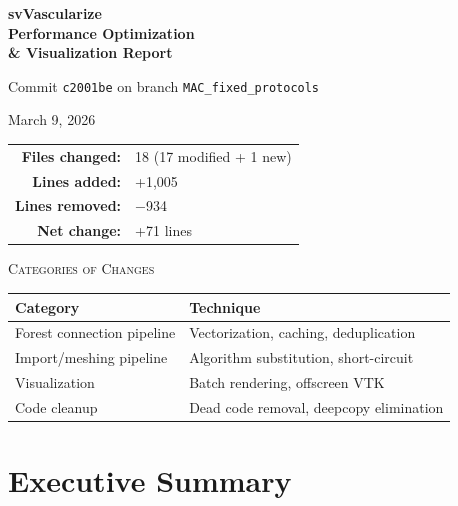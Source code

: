 \documentclass[11pt,a4paper]{article}
\begin{document}
\begin{titlepage}
\centering
\vspace*{3cm}
{\Huge\bfseries svVascularize\\[0.3em] Performance Optimization\\[0.3em] \& Visualization Report\par}
\vspace{1.5cm}
{\Large Commit \texttt{c2001be} on branch \texttt{MAC\_fixed\_protocols}\par}
\vspace{1cm}
{\large March 9, 2026\par}
\vspace{2cm}

\begin{tabular}{rl}
\textbf{Files changed:} & 18 (17 modified + 1 new) \\
\textbf{Lines added:} & +1,005 \\
\textbf{Lines removed:} & $-$934 \\
\textbf{Net change:} & +71 lines \\
\end{tabular}

\vspace{2cm}

{\large\textsc{Categories of Changes}}\\[0.5em]
\begin{tabular}{ll}
\toprule
Category & Technique \\
\midrule
Forest connection pipeline & Vectorization, caching, deduplication \\
Import/meshing pipeline & Algorithm substitution, short-circuit \\
Visualization & Batch rendering, offscreen VTK \\
Code cleanup & Dead code removal, deepcopy elimination \\
\bottomrule
\end{tabular}

\vfill
\end{titlepage}

\tableofcontents
\newpage

\section{Executive Summary}
\end{document}
